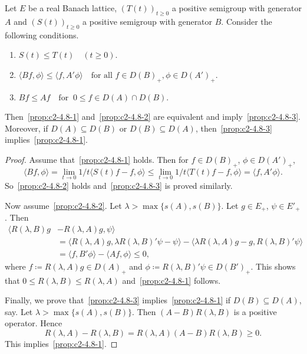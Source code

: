 \begin{proposition}\label{prop:c2-4.8}
Let $E$ be a real Banach lattice, $(T(t))_{t \geq 0}$ a
positive semigroup with generator $A$ and $(S(t))_{t \geq 0}$ a positive
semigroup with generator $B$. Consider the following conditions.
\begin{enumerate}[\upshape (a)]
\item \label{prop:c2-4.8-1}
$S(t) \leq T(t) \quad (t \geq 0)$.
\item \label{prop:c2-4.8-2}
$\langle Bf,\phi\rangle \leq \langle f,A'\phi\rangle \quad \text{for all } f \in D(B)_{+}, \phi \in D(A')_{+}$.
\item \label{prop:c2-4.8-3}
$Bf \leq Af \quad \text{for }\ 0 \leq f \in D(A) \cap D(B)$.
\end{enumerate}
Then~\ref{prop:c2-4.8-1} and~\ref{prop:c2-4.8-2}  are equivalent and imply~\ref{prop:c2-4.8-3}.
Moreover, if\/ $D(A) \subseteq D(B)$ or $D(B) \subseteq D(A)$, then~\ref{prop:c2-4.8-3}   implies~\ref{prop:c2-4.8-1}.
\end{proposition}
\begin{proof}
Assume that~\ref{prop:c2-4.8-1}   holds. 
Then for $f \in D(B)_{+}$, $\phi \in D(A')_{+}$,
\begin{equation*}
\langle Bf,\phi\rangle = \lim_{t \to 0} 1/t \langle S(t)f - f, \phi\rangle \leq \lim_{t \to 0} 1/t \langle T(t)f - f, \phi\rangle 
= \langle f, A'\phi\rangle.
\end{equation*}
So~\ref{prop:c2-4.8-2}   holds and~\ref{prop:c2-4.8-3}   is proved similarly.

Now assume~\ref{prop:c2-4.8-2}. 
Let $\lambda > \max \{s(A), s(B)\}$. Let $g \in E_{+}$, $\psi \in E'_{+}$.
Then 
\begin{align*}
\langle R(\lambda,B)g &- R(\lambda,A)g, \psi\rangle\\
&= \langle R(\lambda,A)g, \lambda R(\lambda,B)'\psi - \psi\rangle - \langle \lambda R(\lambda,A)g - g, R(\lambda,B)'\psi\rangle\\
&= \langle f, B'\phi\rangle - \langle Af, \phi\rangle \leq 0,
\end{align*}
where $f \coloneq R(\lambda,A)g \in D(A)_{+}$ and $\phi \coloneq R(\lambda,B)'\psi \in D(B')_{+}$. 
This shows that $0 \leq R(\lambda,B) \leq R(\lambda,A)$ and~\ref{prop:c2-4.8-1}   follows.

Finally, we prove that~\ref{prop:c2-4.8-3}   implies~\ref{prop:c2-4.8-1}   if\/ $D(B) \subseteq D(A)$, say.
Let $\lambda > \max\{s(A),s(B)\}$. 
Then $(A - B)R(\lambda,B)$ is a positive operator.
Hence 
\[
R(\lambda,A) - R(\lambda,B) = R(\lambda,A)(A - B)R(\lambda,B) \geq 0 .
\]
This implies~\ref{prop:c2-4.8-1}.
\end{proof}
